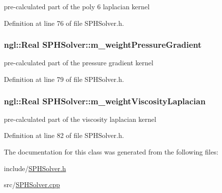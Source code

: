pre-\/calculated part of the poly 6 laplacian kernel 



Definition at line 76 of file SPHSolver.h.

\hypertarget{class_s_p_h_solver_a69a9cc39ecf773ca645afd281794cf9a}{
\subsubsection[{m\_\-weightPressureGradient}]{\setlength{\rightskip}{0pt plus 5cm}ngl::Real {\bf SPHSolver::m\_\-weightPressureGradient}}}
\label{class_s_p_h_solver_a69a9cc39ecf773ca645afd281794cf9a}


pre-\/calculated part of the pressure gradient kernel 



Definition at line 79 of file SPHSolver.h.

\hypertarget{class_s_p_h_solver_a7c059675a5ca3fec7f4bf7e59d19f5ab}{
\subsubsection[{m\_\-weightViscosityLaplacian}]{\setlength{\rightskip}{0pt plus 5cm}ngl::Real {\bf SPHSolver::m\_\-weightViscosityLaplacian}}}
\label{class_s_p_h_solver_a7c059675a5ca3fec7f4bf7e59d19f5ab}


pre-\/calculated part of the viscosity laplacian kernel 



Definition at line 82 of file SPHSolver.h.



The documentation for this class was generated from the following files:\begin{DoxyCompactItemize}
\item 
include/\hyperlink{_s_p_h_solver_8h}{SPHSolver.h}\item 
src/\hyperlink{_s_p_h_solver_8cpp}{SPHSolver.cpp}\end{DoxyCompactItemize}
